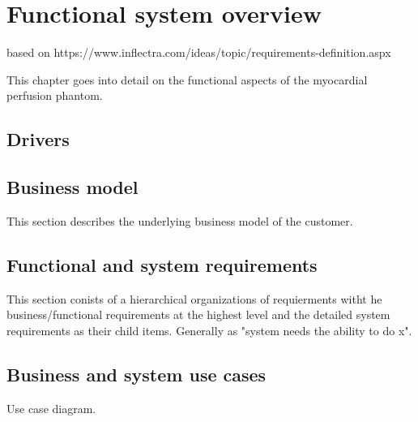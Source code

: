 \chapter{Functional system overview}
based on https://www.inflectra.com/ideas/topic/requirements-definition.aspx

This chapter goes into detail on the functional aspects of the myocardial perfusion phantom.
\section{Drivers}


\section{Business model}
This section describes the underlying business model of the customer.

\section{Functional and system requirements}
This section conists of a hierarchical organizations of requierments witht he business/functional requirements at the highest level and the detailed system requirements as their child items. Generally as "system needs the ability to do x".

\section{Business and system use cases}	
Use case diagram.
